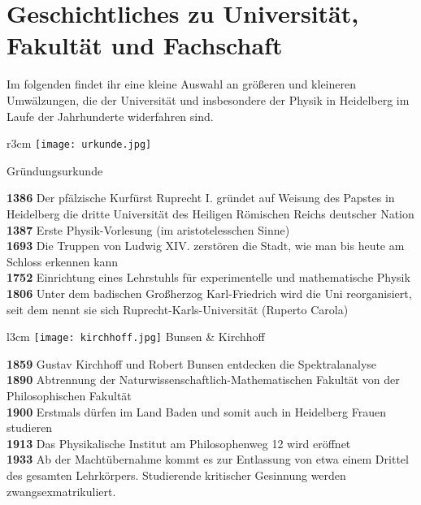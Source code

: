 
\section*{Geschichtliches zu Universität, Fakultät und Fachschaft}

Im folgenden findet ihr eine kleine Auswahl an größeren und kleineren Umwälzungen, die der Universität und insbesondere der Physik in Heidelberg im Laufe der Jahrhunderte widerfahren sind.

\begin{wrapfigure}[]{r}{3cm}
\vspace{-13pt}
\texttt{[image: urkunde.jpg]}

\small{Gründungsurkunde}
\end{wrapfigure}

\textbf{1386} Der pfälzische Kurfürst Ruprecht I. gründet auf Weisung des Papstes in Heidelberg die dritte Universität des Heiligen Römischen Reichs deutscher Nation\\
\textbf{1387}  Erste Physik-Vorlesung (im aristotelesschen Sinne)\\
\textbf{1693} Die Truppen von Ludwig XIV. zerstören die Stadt, wie man bis heute am Schloss erkennen kann\\
\textbf{1752} Einrichtung eines Lehrstuhls für experimentelle und mathematische Physik\\
\textbf{1806} Unter dem badischen Großherzog Karl-Friedrich wird die Uni reorganisiert, seit dem nennt sie sich Ruprecht-Karls-Universität (Ruperto Carola)

\begin{wrapfigure}{l}{3cm}
\vspace{-13pt}
\texttt{[image: kirchhoff.jpg]}
\small{Bunsen \& Kirchhoff}
\vspace{-13pt}
\end{wrapfigure}

\textbf{1859} Gustav Kirchhoff und Robert Bunsen entdecken die Spektralanalyse\\
\textbf{1890} Abtrennung der Naturwissenschaftlich-Mathematischen Fakultät von der Philosophischen Fakultät\\
\textbf{1900} Erstmals dürfen im Land Baden und somit auch in Heidelberg Frauen studieren\\
\textbf{1913} Das Physikalische Institut am Philosophenweg 12 wird eröffnet\\
\textbf{1933} Ab der Machtübernahme kommt es zur Entlassung von etwa einem Drittel des gesamten Lehrkörpers. Studierende kritischer Gesinnung werden zwangsexmatrikuliert. 

